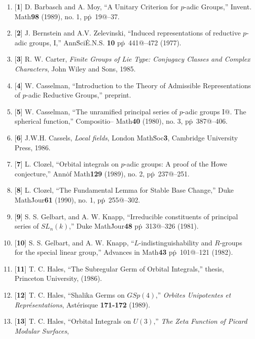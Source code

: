 \documentclass{amsart}
\begin{document}
%
\begin{enumerate}
\item{[{\bf 1}]}
  D. Barbasch and A. Moy,
  ``A Unitary Criterion for $p$-adic Groups,'' Invent. Math\. {\bf 98}
  (1989), no. 1, pp\.~19@--37.
%
\item{[{\bf 2}]}
  J. Bernstein and A.V. Zelevinski,
  ``Induced representations of reductive $p$-adic groups, I,''
  Ann\. Sci\. E.N.S. {\bf 10}
  pp\.~441@--472 (1977).
%
\item{[{\bf 3}]}
  R. W. Carter,
  {\sl Finite Groups of Lie Type: Conjugacy Classes and Complex
     Characters},
  John Wiley and Sons, 1985.
%
\item{[{\bf 4}]}
  W. Casselman,
  ``Introduction to the Theory of Admissible Representations
     of $p$-adic Reductive Groups,'' preprint.
%
\item{[{\bf 5}]}
  W. Casselman,
  ``The unramified principal series of $p$-adic groups I@. 
    The spherical function,'' Compositio-- Math\. {\bf 40}
    (1980), no. 3, pp\.~387@--406.
%
\item{[{\bf 6}]}
  J.W.H. Cassels,
  {\sl Local fields}, London Math\. Soc\. {\bf 3}, Cambridge
  University Press, 1986.
%
\item{[{\bf 7}]}
  L. Clozel,
  ``Orbital integrals on $p$-adic groups:  A proof of 
     the Howe conjecture,''  Ann\. of Math\. {\bf 129} (1989),
     no. 2, pp\.~237@--251.
%
\item{[{\bf 8}]}
  L. Clozel,
  ``The Fundamental Lemma for Stable Base Change,''
  Duke Math\. Jour\. {\bf 61} (1990), no. 1, pp\.~255@--302.
%
\item{[{\bf 9}]}
  S. S. Gelbart, and A. W. Knapp,
  ``Irreducible constituents of principal series of $SL_n(k)$,''
  Duke Math\. Jour\. {\bf 48} pp\.~313@--326 (1981).
%
\item{[{\bf 10}]}
  S. S. Gelbart, and A. W. Knapp,
  ``$L$-indistinguishability and $R$-groups for the
     special linear group,''
  Advances in Math\. {\bf 43} pp\.~101@--121 (1982).
%
\item{[{\bf 11}]}
  T. C. Hales,
  ``The Subregular Germ of Orbital Integrals,''
  thesis, Princeton University, (1986).
%
\item{[{\bf 12}]}
  T. C. Hales,\enspace%
  ``Shalika Germs on $GSp(4)$,''
  {\sl Orbites Uni\-po\-tentes et Repr\'e\-sen\-ta\-tions}, 
  Ast\'erisque {\bf 171-172} (1989).
%
\item{[{\bf 13}]}
  T. C. Hales,
  ``Orbital Integrals on $U(3)$,''
  {\sl The Zeta Function of Picard Modular Surfaces},

\end{enumerate}
\end{document}
